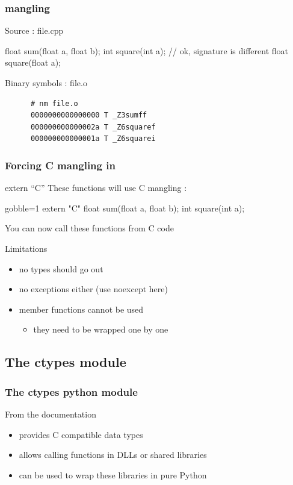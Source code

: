 \begin{frame}[fragile]
  \frametitle{\cpp mangling}
  \begin{exampleblock}{Source : file.cpp}
    \begin{cppcode*}{}
      float sum(float a, float b);
      int square(int a);
      // ok, signature is different
      float square(float a);
    \end{cppcode*}
  \end{exampleblock}
  \begin{block}{Binary symbols : file.o}
    \begin{verbatim}
      # nm file.o
      0000000000000000 T _Z3sumff
      000000000000002a T _Z6squaref
      000000000000001a T _Z6squarei
    \end{verbatim}
  \end{block}
\end{frame}

\begin{frame}[fragile]
  \frametitle{Forcing C mangling in \cpp}
  \begin{block}{extern ``C''}
    These functions will use C mangling :
    \begin{cppcode*}{gobble=1}
      extern "C" {
        float sum(float a, float b);
        int square(int a);
      }
    \end{cppcode*}
  \end{block}
  \pause
  You can now call these \cpp functions from C code
  \pause
  \begin{alertblock}{Limitations}
    \begin{itemize}
    \item no \cpp types should go out
    \item no exceptions either (use noexcept here)
    \item member functions cannot be used
      \begin{itemize}
      \item they need to be wrapped one by one
      \end{itemize}
    \end{itemize}
  \end{alertblock}
\end{frame}

\subsection[ctypes]{The ctypes module}

\begin{frame}[fragile]
  \frametitle{The ctypes python module}
  \begin{block}{From the documentation}
    \begin{itemize}
    \item provides C compatible data types
    \item allows calling functions in DLLs or shared libraries
    \item can be used to wrap these libraries in pure Python
    \end{itemize}
  \end{block}
\end{frame}

